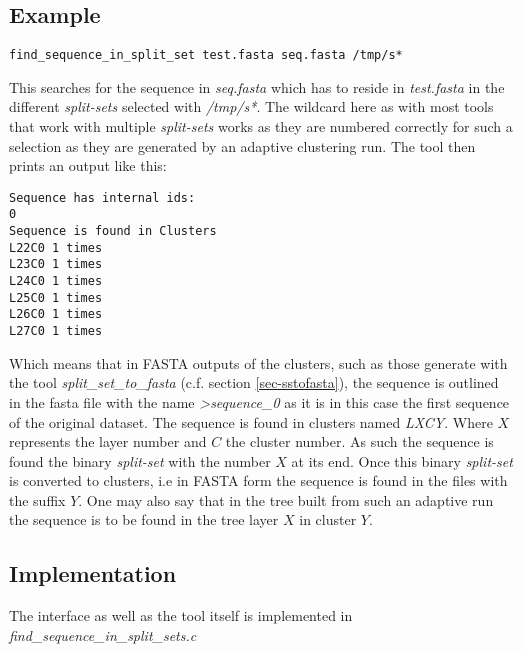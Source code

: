 \subsection{Example}
\begin{lstlisting}
find_sequence_in_split_set test.fasta seq.fasta /tmp/s*
\end{lstlisting}
This searches for the sequence in \emph{seq.fasta} which has to reside
in \emph{test.fasta} in the different \emph{split-sets} selected with
\emph{/tmp/s*}. The wildcard here as with most tools that work with
multiple \emph{split-sets} works as they are numbered correctly for
such a selection as they are generated by an adaptive clustering run.
The tool then prints an output like this:
\begin{lstlisting}
Sequence has internal ids: 
0 
Sequence is found in Clusters
L22C0 1 times
L23C0 1 times
L24C0 1 times
L25C0 1 times
L26C0 1 times
L27C0 1 times
\end{lstlisting}
Which means that in FASTA outputs of the clusters, such as those
generate with the tool \emph{split\_set\_to\_fasta} (c.f. section
\ref{sec-sstofasta}), the sequence is
outlined in the fasta file with the name \emph{>sequence\_0} as it is
in this case the first sequence of the original dataset. The sequence
is found in clusters named \emph{LXCY}. Where $X$ represents the layer
number and $C$ the cluster number. As such the sequence is found the
binary \emph{split-set} with the number $X$ at its end. Once this
binary \emph{split-set} is converted to clusters, i.e in FASTA form
the sequence is found in the files with the suffix $Y$. One may also
say that in the tree built from such an adaptive run the sequence is
to be found in the tree layer $X$ in cluster $Y$.

\subsection{Implementation}
The interface as well as the tool itself is implemented in
\emph{find\_sequence\_in\_split\_sets.c}
